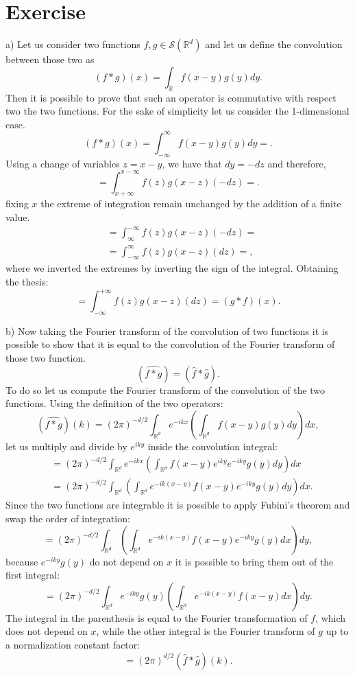 \documentclass{article}
\begin{document}
\section{Exercise}
a) Let us consider two functions $f, g \in \mathcal{S}(\mathbb{R}^d)$ and let us define the convolution between those two as
\[
    (f*g)(x) = \int_{\mathbb{R}} f(x-y)g(y)dy.
\]
Then it is possible to prove that such an operator is commutative with respect two the two functions. For the sake of simplicity let us consider the 1-dimensional case.
\[
        (f*g)(x) = \int_{-\infty}^{\infty} f(x-y)g(y)dy =.
\]
Using a change of variables $z = x-y$, we have that $dy= -dz$ and therefore,
\[
    =  \int_{x+\infty}^{x-\infty} f(z)g(x-z)(-dz) = .
\]
fixing $x$ the extreme of integration remain unchanged by the addition of a finite value.
\[
    \begin{split}
        &=  \int_{\infty}^{-\infty} f(z)g(x-z)(-dz) =\\
        &= \int_{-\infty}^{\infty} f(z)g(x-z)(dz) =,
    \end{split}
\]
where we inverted the extremes by inverting the sign of the integral. Obtaining the thesis:
\[
    = \int_{-\infty}^{+\infty} f(z)g(x-z)(dz) = (g*f)(x).
\]

b) Now taking the Fourier transform of the convolution of two functions it is possible to show that it is equal to the convolution of the Fourier transform of those two function.
\[
    (\widehat{f*g}) = (\hat{f}* \hat{g}).
\]
To do so let us compute the Fourier transform of the convolution of the two functions. Using the definition of the two operators:
\[
    (\widehat{f*g}) (k) = (2\pi)^{-d/2}\int_{\mathbb R^d} e^{-ikx}\left( \int_{\mathbb R ^ d} f(x-y)g(y) dy\right) dx,
\]
let us multiply and divide by $e^{iky}$ inside the convolution integral:
\[
   \begin{split}
        &= (2\pi)^{-d/2}\int_{\mathbb R^d} e^{-ikx}\left( \int_{\mathbb R ^ d} f(x-y) e^{iky} e^{-iky} g(y) dy\right) dx\\
        &= (2\pi)^{-d/2} \int_{\mathbb R^d} \left( \int_{\mathbb R ^ d} e^{-ik(x-y)} f(x-y)  e^{-iky} g(y) dy\right) dx.
   \end{split}
\]
Since the two functions are integrable it is possible to apply Fubini's theorem and swap the order of integration:
\[
    =(2\pi)^{-d/2} \int_{\mathbb R^d} \left( \int_{\mathbb R ^ d} e^{-ik(x-y)} f(x-y)  e^{-iky} g(y) dx\right) dy,
\]
because $ e^{-iky} g(y)$ do not depend on $x$ it is possible to bring them out of the first integral:
\[
   = (2\pi)^{-d/2} \int_{\mathbb R^d} e^{-iky} g(y) \left( \int_{\mathbb R ^ d} e^{-ik(x-y)} f(x-y)   dx\right) dy.
\]
The integral in the parenthesis is equal to the Fourier transformation of $f$, which does not depend on $x$, while the other integral is the Fourier transform of $g$ up to a normalization constant factor:
\[
    = (2\pi)^{d/2}(\hat f * \hat g)(k).
\]
\end{document}
